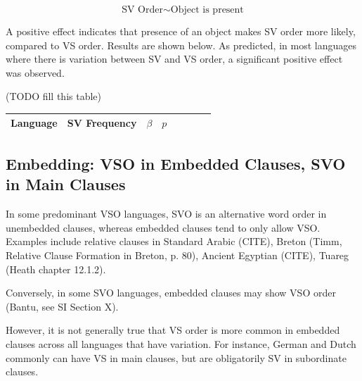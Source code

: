 \documentclass[11pt,a4paper]{article}
\newcommand\mhahn[1]{{\color{red}(#1)}}
\begin{document}
\begin{equation}
\text{SV Order} \sim \text{Object is present}
\end{equation}

A positive effect indicates that presence of an object makes SV order more likely, compared to VS order.
Results are shown below.
As predicted, in most languages where there is variation between SV and VS order, a significant positive effect was observed.

\mhahn{TODO fill this table}
\begin{longtable}{l|lllllll}
Language & SV Frequency & $\beta$ & $p$ \\ \hline
%
\end{longtable}




\subsection{Embedding: VSO in Embedded Clauses, SVO in Main Clauses}
In some predominant VSO languages, SVO is an alternative word order in unembedded clauses, whereas embedded clauses tend to only allow VSO.
Examples include relative clauses in Standard Arabic (CITE), Breton (Timm, Relative Clause Formation in Breton, p. 80), Ancient Egyptian (CITE), Tuareg (Heath chapter 12.1.2).


Conversely, in some SVO languages, embedded clauses may show VSO order (Bantu, see SI Section X).

However, it is not generally true that VS order is more common in embedded clauses across all languages that have variation. For instance, German and Dutch commonly can have VS in main clauses, but are obligatorily SV in subordinate clauses.

\end{document}
